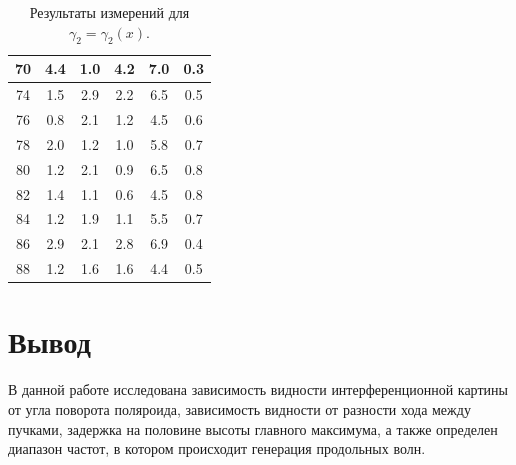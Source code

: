 \documentclass[a4paper, 12pt]{article}%
\begin{document}
\begin{table}[H]
\begin{tabular}{|c|c|c|c|c|c|}
70      & 4.4        & 1.0        & 4.2        & 7.0        & 0.3       \\ \hline
74      & 1.5        & 2.9        & 2.2        & 6.5        & 0.5       \\ \hline
76      & 0.8        & 2.1        & 1.2        & 4.5        & 0.6       \\ \hline
78      & 2.0        & 1.2        & 1.0        & 5.8        & 0.7       \\ \hline
80      & 1.2        & 2.1        & 0.9        & 6.5        & 0.8       \\ \hline
82      & 1.4        & 1.1        & 0.6        & 4.5        & 0.8       \\ \hline
84      & 1.2        & 1.9        & 1.1        & 5.5        & 0.7       \\ \hline
86      & 2.9        & 2.1        & 2.8        & 6.9        & 0.4       \\ \hline
88      & 1.2        & 1.6        & 1.6        & 4.4        & 0.5       \\ \hline
\end{tabular}
\centering
\caption{Результаты измерений для $\gamma_2 = \gamma_2(x)$.}
\end{table}
\section*{Вывод}
В данной работе исследована зависимость видности интерференционной картины от угла поворота поляроида, зависимость видности от разности хода между пучками, задержка на половине высоты главного максимума, а также определен диапазон частот, в котором происходит генерация продольных волн.
\end{document}
